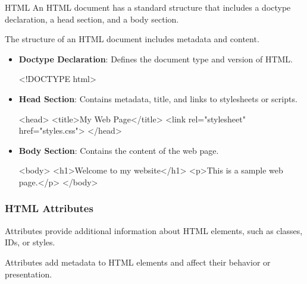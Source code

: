 \begin{notes}{HTML}
    An HTML document has a standard structure that includes a doctype declaration, a head section, and a body section.
    
    \begin{highlight}
    
        The structure of an HTML document includes metadata and content.
        
        \begin{itemize}
            \item \textbf{Doctype Declaration}: Defines the document type and version of HTML.
    \begin{code}[HTML]
    <!DOCTYPE html>
    \end{code}
            \item \textbf{Head Section}: Contains metadata, title, and links to stylesheets or scripts.
    \begin{code}[HTML]
    <head>
        <title>My Web Page</title>
        <link rel="stylesheet" href="styles.css">
    </head>
    \end{code}
            \item \textbf{Body Section}: Contains the content of the web page.
    \begin{code}[HTML]
    <body>
        <h1>Welcome to my website</h1>
        <p>This is a sample web page.</p>
    </body>
    \end{code}
        \end{itemize}
    
    \end{highlight}
    
    \subsubsection*{HTML Attributes}
    
    Attributes provide additional information about HTML elements, such as classes, IDs, or styles.
    
    \begin{highlight}
    
        Attributes add metadata to HTML elements and affect their behavior or presentation.
        

\end{highlight}
\end{notes}
